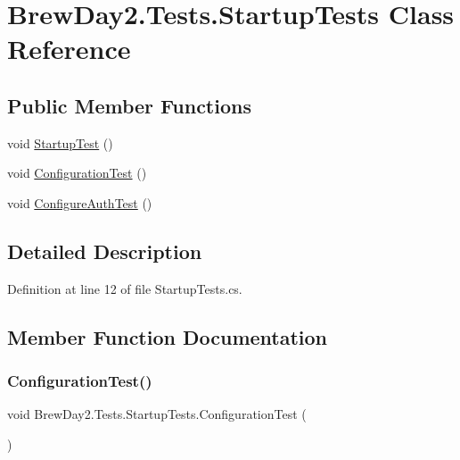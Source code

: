 \hypertarget{class_brew_day2_1_1_tests_1_1_startup_tests}{}\section{Brew\+Day2.\+Tests.\+Startup\+Tests Class Reference}
\label{class_brew_day2_1_1_tests_1_1_startup_tests}
\subsection*{Public Member Functions}
\begin{DoxyCompactItemize}
\item 
void \mbox{\hyperlink{class_brew_day2_1_1_tests_1_1_startup_tests_a10fcf572a6ae9b2b0dc7149879aa44aa}{Startup\+Test}} ()
\item 
void \mbox{\hyperlink{class_brew_day2_1_1_tests_1_1_startup_tests_a35675571719aeb3f988b6915909687b5}{Configuration\+Test}} ()
\item 
void \mbox{\hyperlink{class_brew_day2_1_1_tests_1_1_startup_tests_a961c7db7ac851c97216d4acf025d5710}{Configure\+Auth\+Test}} ()
\end{DoxyCompactItemize}


\subsection{Detailed Description}


Definition at line 12 of file Startup\+Tests.\+cs.



\subsection{Member Function Documentation}
\mbox{\label{class_brew_day2_1_1_tests_1_1_startup_tests_a35675571719aeb3f988b6915909687b5}} 
\subsubsection{\texorpdfstring{Configuration\+Test()}{ConfigurationTest()}}
{\footnotesize\ttfamily void Brew\+Day2.\+Tests.\+Startup\+Tests.\+Configuration\+Test (\begin{DoxyParamCaption}{ }\end{DoxyParamCaption})}



